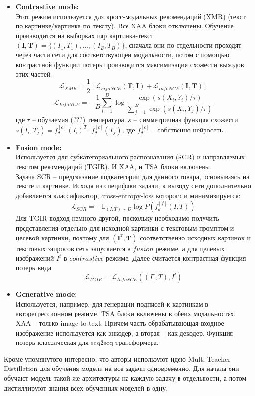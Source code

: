 \documentclass[a4paper,12pt]{article}
\begin{document}
\begin{itemize}
	\item[]\textbf{Contrastive mode:}\\
	Этот режим используется для кросс-модальных рекомендаций (XMR) (текст по картинке/картинка по тексту). Все XAA блоки отключены. Обучение производится на выборках пар картинка-текст $(\textbf{I}, \textbf{T}) = \{(I_1, T_1), \dots, (I_B, T_B)\}$, сначала они по отдельности проходят через части сети для соответствующей модальности, потом с помощью контрастной функции потерь производится максимизация схожести выходов этих частей.
	$$\mathcal{L}_{XMR} = \frac{1}{2} [\mathcal{L}_{InfoNCE}(\mathbf{T}, \mathbf{I}) + \mathcal{L}_{InfoNCE}(\mathbf{I}, \mathbf{T})]$$
	$$\mathcal{L}_{InfoNCE} = -\frac{1}{B}\sum\limits_{i=1}^{B}\log\frac{\exp(s(X_i, Y_i)/\tau)}{\sum_{j=1}^B\exp(s(X_i, Y_j)/\tau)}$$
	где $\tau$ -- обучаемая (???) температура. $s$ -- симметричная функция схожести $s(I_i, T_j) = f_\theta^{[c]}(I_i)^T\cdot f_\theta^{[c]}(T_j)$, где $f_\theta^{[c]}$ -- собственно нейросеть.
	\item[]\textbf{Fusion mode:}\\
	Используется для субкатегориального распознавания (SCR) и направляемых текстом рекомендаций (TGIR). И XAA, и TSA блоки включены. \\
	Задача SCR -- предсказание подкатегории для данного товара, основываясь на тексте и картинке. Исходя из специфики задачи, к выходу сети дополнительно добавляется классификатор, cross-entropy-loss которого и минимизируется:
	$$\mathcal{L}_{SCR} = -\mathbb{E}_{(I,T)\sim D}\log P\left(f_\theta^{[f]}(I, T)\right)$$
	Для TGIR подход немного другой, поскольку необходимо получить представления отдельно для исходной картинки с текстовым промптом и целевой картинки, поэтому для $(\mathbf{I^r}, \mathbf{T})$ соответственно исходных картинок и текстовых запросов сеть запускается в $fusion$ режиме, а для целевых изображений $I^t$ в $contrastive$ режиме. Далее считается контрастная функция потерь вида
	$$\mathcal{L}_{TGIR} = \mathcal{L}_{InfoNCE}((I^r,T), I^t)$$
	
	\item[]\textbf{Generative mode:}\\
	Используется, например, для генерации подписей к картинкам в авторегрессионном режиме. TSA блоки включены в обеих модальностях, XAA -- только image-to-text. Причем часть обрабатывающая входное изображение используется как энкодер, а вторая -- как декодер. Функция потерь классическая для seq2seq трансформера.
\end{itemize}

Кроме упомянутого интересно, что авторы используют идею Multi-Teacher Distillation для обучения модели на все задачи одновременно. Для начала они обучают модель такой же архитектуры на каждую задачу в отдельности, а потом дистиллируют знания всех обученных моделей в одну.





		
\end{document}
